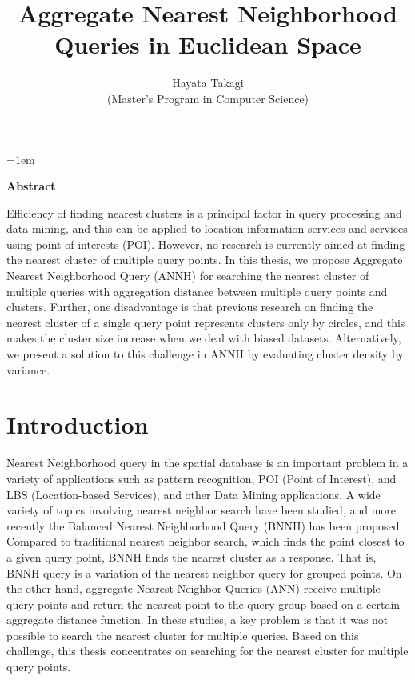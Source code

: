 \documentclass[a4paper,11pt]{report}
\title{Aggregate Nearest Neighborhood Queries in Euclidean Space}
\author{Hayata Takagi\\ (Master's Program in Computer Science)}
\theoremstyle{mytheoremstyle}
\begin{document}
\maketitle
\thispagestyle{empty}
\newpage

\thispagestyle{empty}
\vspace*{20pt plus 1fil}
\parindent=1em
\noindent

\begin{center}
    \textbf{Abstract}
\end{center}
\vspace{0.2in}

Efficiency of finding nearest clusters is a principal factor in query processing and data mining, and this can be applied to location information services and services using point of interests (POI). However, no research is currently aimed at finding the nearest cluster of multiple query points. In this thesis, we propose Aggregate Nearest Neighborhood Query (ANNH) for searching the nearest cluster of multiple queries with aggregation distance between multiple query points and clusters. Further, one disadvantage is that previous research on finding the nearest cluster of a single query point represents clusters only by circles, and this makes the cluster size increase when we deal with biased datasets. Alternatively, we present a solution to this challenge in ANNH by evaluating cluster density by variance.

\par
\vspace{0pt plus 1fil}
\newpage

\tableofcontents
\listoffigures

\pagebreak \setcounter{page}{1}


\chapter{Introduction}
Nearest Neighborhood query in the spatial database is an important problem in a variety of applications such as pattern recognition, POI (Point of Interest), and LBS (Location-based Services), and other Data Mining applications\cite{adeniyi2016automated}. A wide variety of topics involving nearest neighbor search have been studied, and more recently the Balanced Nearest Neighborhood Query (BNNH)\cite{BNNH} has been proposed. Compared to traditional nearest neighbor search, which finds the point closest to a given query point, BNNH finds the nearest cluster as a response. That is, BNNH query is a variation of the nearest neighbor query for grouped points. On the other hand, aggregate Nearest Neighbor Queries (ANN)\cite{ANN} receive multiple query points and return the nearest point to the query group based on a certain aggregate distance function. In these studies, a key problem is that it was not possible to search the nearest cluster for multiple queries. Based on this challenge, this thesis concentrates on searching for the nearest cluster for multiple query points.
\end{document}
